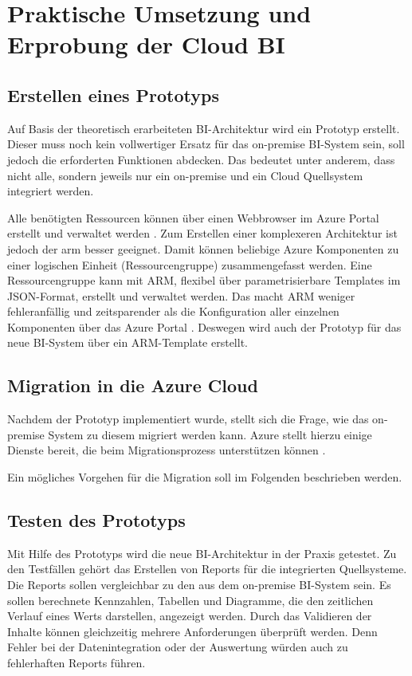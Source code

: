 \chapter{Praktische Umsetzung und Erprobung der Cloud BI} \label{ch:praktischeUmsetzung}

\section{Erstellen eines Prototyps} \label{sec:intro:erstellenDesPrototyps}
Auf Basis der theoretisch erarbeiteten BI-Architektur wird ein Prototyp erstellt. Dieser muss noch kein vollwertiger Ersatz für das on-premise BI-System sein, soll jedoch die erforderten Funktionen abdecken. Das bedeutet unter anderem, dass nicht alle, sondern jeweils nur ein on-premise und ein Cloud Quellsystem integriert werden.

Alle benötigten Ressourcen können über einen Webbrowser im Azure Portal erstellt und verwaltet werden \cite{chilberto_building_2020}. Zum Erstellen einer komplexeren Architektur ist jedoch der \ac{arm} besser geeignet. Damit können beliebige Azure Komponenten zu einer logischen Einheit (Ressourcengruppe) zusammengefasst werden. Eine Ressourcengruppe kann mit ARM, flexibel über parametrisierbare Templates im JSON-Format, erstellt und verwaltet werden. Das macht ARM weniger fehleranfällig und zeitsparender als die Konfiguration aller einzelnen Komponenten über das Azure Portal \cite{monadjemi_azure-administration_2017}. Deswegen wird auch der Prototyp für das neue BI-System über ein ARM-Template erstellt.

\section{Migration in die Azure Cloud} \label{sec:praktischeUmsetzung:Migration}
Nachdem der Prototyp implementiert wurde, stellt sich die Frage, wie das on-premise System zu diesem migriert werden kann. Azure stellt hierzu einige Dienste bereit, die beim Migrationsprozess unterstützen können \cite{chilberto_building_2020}. 

Ein mögliches Vorgehen für die Migration soll im Folgenden beschrieben werden.

\section{Testen des Prototyps} \label{sec:intro:testenDesPrototyps} 
Mit Hilfe des Prototyps wird die neue BI-Architektur in der Praxis getestet. Zu den Testfällen gehört das Erstellen von Reports für die integrierten Quellsysteme. Die Reports sollen vergleichbar zu den aus dem on-premise BI-System sein. Es sollen berechnete Kennzahlen, Tabellen und Diagramme, die den zeitlichen Verlauf eines Werts darstellen, angezeigt werden. Durch das Validieren der Inhalte können gleichzeitig mehrere Anforderungen überprüft werden. Denn Fehler bei der Datenintegration oder der Auswertung würden auch zu fehlerhaften Reports führen.